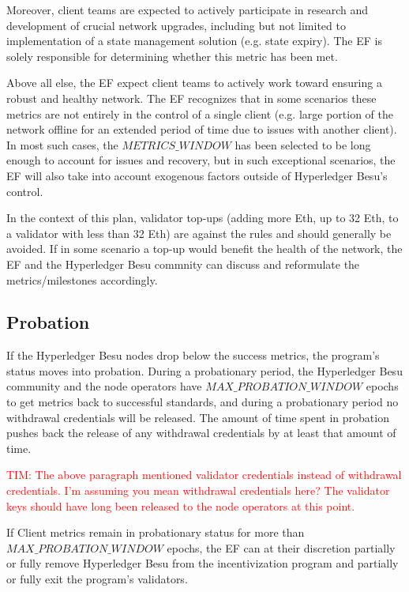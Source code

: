 Moreover, client teams are expected to actively participate in research and development of crucial network upgrades, including but not limited to implementation of a state management solution (e.g. state expiry). The EF is solely responsible for determining whether this metric has been met.

Above all else, the EF expect client teams to actively work toward ensuring a robust and healthy network. The EF recognizes that in some scenarios these metrics are not entirely in the control of a single client (e.g. large portion of the network offline for an extended period of time due to issues with another client). In most such cases, the $METRICS\_WINDOW$ has been selected to be long enough to account for issues and recovery, but in such exceptional scenarios, the EF will also take into account exogenous factors outside of Hyperledger Besu’s control.

In the context of this plan, validator top-ups (adding more Eth, up to 32 Eth, to a validator with less than 32 Eth) are against the rules and should generally be avoided. If in some scenario a top-up would benefit the health of the network, the EF and the Hyperledger Besu commnity can discuss and reformulate the metrics/milestones accordingly.

\subsection{Probation}
If the Hyperledger Besu nodes drop below the success metrics, the program's status moves into probation. During a probationary period, the Hyperledger Besu community and the node operators have $MAX\_PROBATION\_WINDOW$ epochs to get metrics back to successful standards, and during a probationary period no withdrawal credentials will be released. The amount of time spent in probation pushes back the release of any withdrawal credentials by at least that amount of time.

\textcolor{red}{TIM:  The above paragraph mentioned validator credentials instead of withdrawal credentials.  I'm assuming you mean withdrawal credentials here?  The validator keys should have long been released to the node operators at this point.}

If Client metrics remain in probationary status for more than $MAX\_PROBATION\_WINDOW$ epochs, the EF can at their discretion partially or fully remove Hyperledger Besu from the incentivization program and partially or fully exit the program’s validators.

